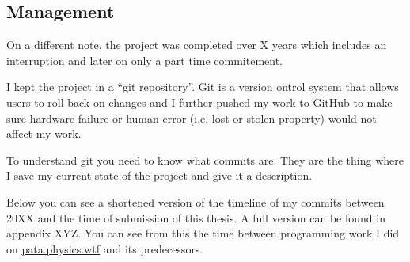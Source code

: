 {\subsection{Management}

On a different note, the project was completed over X years which includes an interruption and later on only a part time commitement.

I kept the project in a ``git repository''. Git is a version ontrol system that allows users to roll-back on changes and I further pushed my work to GitHub to make sure hardware failure or human error (i.e. lost or stolen property) would not affect my work. 

To understand git you need to know what commits are. They are the thing where I save my current state of the project and give it a description.

Below you can see a shortened version of the timeline of my commits between 20XX and the time of submission of this thesis. A full version can be found in appendix XYZ. You can see from this the time between programming work I did on \url{pata.physics.wtf} and its predecessors.


}
